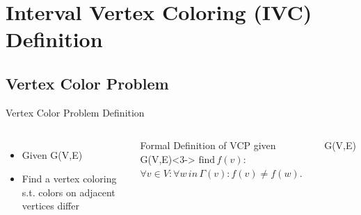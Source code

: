 \section{Interval Vertex Coloring (IVC) Definition}
\subsection*{Vertex Color Problem}
\begin{frame}{Vertex Color Problem Definition}
  \begin{columns}
      \begin{itemize}
        \item<1-> Given G(V,E)
        \item<2-> Find a vertex coloring s.t. colors on adjacent vertices differ
      \end{itemize}
      \begin{block}{Formal Definition of VCP given G(V,E)}<3->
        $\text{find} \, f(v):$
        $\forall v\in V:\forall w \, in \, \Gamma(v): f(v) \neq f(w).$
      \end{block}
      
    \centering
    
    
    \null
    \begin{center}
      G(V,E) \\
      $\,$  $\,$ \\
    \end{center}
    
    \vspace{0.1cm}


\end{columns}
\end{frame}
